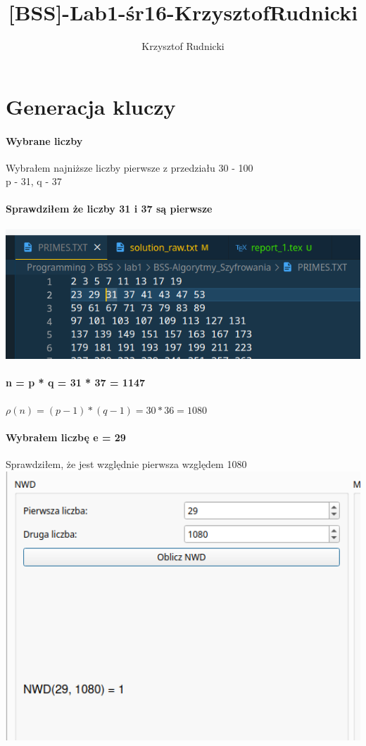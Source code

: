 \documentclass{article}[12pt]
\title{[BSS]-Lab1-śr16-KrzysztofRudnicki}
\author{Krzysztof Rudnicki}
\begin{document}
 
\maketitle 
\section{Generacja kluczy}
\paragraph{Wybrane liczby}
Wybrałem najniższe liczby pierwsze z przedziału 30 - 100 \\ 
p - 31, q - 37
\paragraph{Sprawdziłem że liczby 31 i 37 \textbf{są} pierwsze \\}
\includegraphics[width=1\textwidth]{one.png}
\paragraph{n = p * q = 31 * 37 = 1147}
\paragraph{$\rho(n) = (p-1) * (q-1) = 30 * 36 = 1080$}
\paragraph{Wybrałem liczbę e = 29}
Sprawdziłem, że jest względnie pierwsza względem 1080 \\ 
\includegraphics[width=1\textwidth]{two.png}
\end{document}
